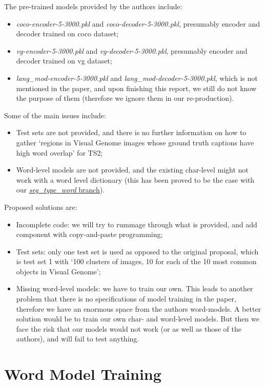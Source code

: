 \documentclass[a4paper]{scrartcl}
\begin{document}
The pre-trained models provided by the authors include: 
\begin{itemize}
  \item \emph{coco-encoder-5-3000.pkl} and \emph{coco-decoder-5-3000.pkl}, presumably encoder and decoder trained on coco dataset;
  \item \emph{vg-encoder-5-3000.pkl} and \emph{vg-decoder-5-3000.pkl}, presumably encoder and decoder trained on vg dataset;
  \item \emph{lang\_mod-encoder-5-3000.pkl} and \emph{lang\_mod-decoder-5-3000.pkl}, which is not mentioned in the paper, and upon finishing this report, we still do not know the purpose of them (therefore we ignore them in our re-production).
\end{itemize}

Some of the main issues include:
\begin{itemize}
  \item Test sets are not provided, and there is no further information on how to gather `regions in Visual Genome images whose ground truth captions have high word overlap' for TS2;
  \item Word-level models are not provided, and the existing char-level might not work with a word level dictionary (this has been proved to be the case with our \href{https://github.com/Meng3www/PPlusPlus/tree/seg_type_word}{\emph{seg\_type\_word} branch}). 
\end{itemize}

Proposed solutions are:
\begin{itemize}
  \item Incomplete code: we will try to rummage through what is provided, and add component with copy-and-paste programming;
  \item Test sets: only one test set is used as opposed to the original proposal, which is test set 1 with `100 clusters of images, 10 for each of the 10 most common objects in Visual Genome';
  \item Missing word-level models: we have to train our own. This leads to another problem that there is no specifications of model training in the paper, therefore we have an enormous space from the authors word-models. A better solution would be to train our own char- and word-level models. But then we face the risk that our models would not work (or as well as those of the authors), and will fail to test anything. 
\end{itemize}

\section*{Word Model Training}
\end{document}
